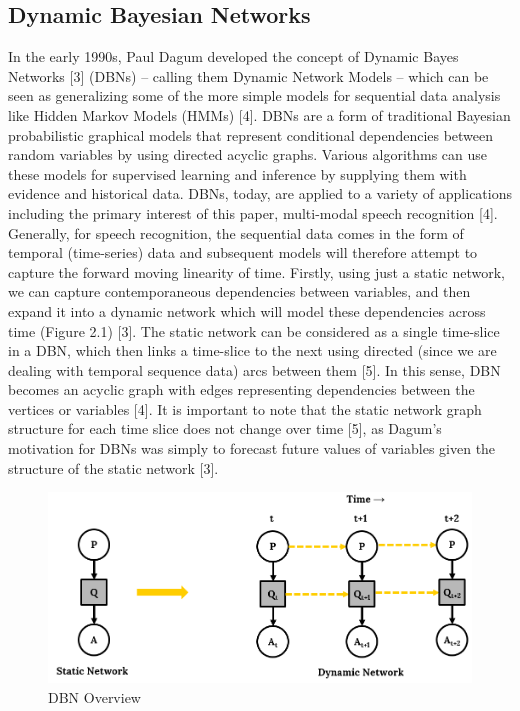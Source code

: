 \documentclass[11pt,letterpaper]{article}
\begin{document}
\subsection{Dynamic Bayesian Networks}
In the early 1990s, Paul Dagum developed the concept of Dynamic Bayes Networks [3] (DBNs) – calling them Dynamic Network Models – which can be seen as generalizing some of the more simple models for sequential data analysis like Hidden Markov Models (HMMs) [4]. DBNs are a form of traditional Bayesian probabilistic graphical models that represent conditional dependencies between random variables by using directed acyclic graphs. Various algorithms can use these models for supervised learning and inference by supplying them with evidence and historical data. DBNs, today, are applied to a variety of applications including the primary interest of this paper, multi-modal speech recognition [4]. Generally, for speech recognition, the sequential data comes in the form of temporal (time-series) data and subsequent models will therefore attempt to capture the forward moving linearity of time. Firstly, using just a static network, we can capture contemporaneous dependencies between variables, and then expand it into a dynamic network which will model these dependencies across time (Figure 2.1) [3]. The static network can be considered as a single time-slice in a DBN, which then links a time-slice to the next using directed (since we are dealing with temporal sequence data) arcs between them [5]. In this sense, DBN becomes an acyclic graph with edges representing dependencies between the vertices or variables [4]. It is important to note that the static network graph structure for each time slice does not change over time [5], as Dagum’s motivation for DBNs was simply to forecast future values of variables given the structure of the static network [3].

\begin{figure}[ht]
\centering
\includegraphics[scale=0.25]{dbn_description}
\caption{DBN Overview}
\end{figure}
\end{document}
